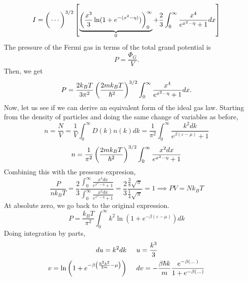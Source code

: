         \begin{equation}
            I = \bigg(\cdots\bigg)^{3/2}\left[ \underbrace{\left( \frac{x^3}{3}\ln(1+e^{-(x^2-\eta)}) \right)_0^\infty}_0+ \frac{2}{3}\int_{0}^{\infty}\frac{x^4}{e^{x^2-\eta}+1}dx \right]
        \end{equation}
        The pressure of the Fermi gas in terms of the total grand potential is
        \begin{equation}
            P = \frac{\Phi_G}{V}.
        \end{equation}
        Then, we get
        \begin{equation}
            P = \frac{2k_BT}{3\pi^2}\left( \frac{2mk_BT}{\hbar^2} \right)^{3/2}\int_{0}^{\infty}\frac{x^4}{e^{x^2-\eta}+1}dx.
        \end{equation}
        Now, let us see if we can derive an equivalent form of the ideal gas law. Starting from the density of particles and doing the same change of variables as before,
        \begin{equation}
            n = \frac{N}{V} = \frac{1}{V}\int_{0}^{\infty}D(k)n(k)dk = \frac{1}{\pi^2}\int_{0}^{\infty}\frac{k^2dk}{e^{\beta(\varepsilon-\mu)}+1}
        \end{equation}
        \begin{equation}
            n = \frac{1}{\pi^2}\left( \frac{2mk_BT}{\hbar^2} \right)^{3/2}\int_{0}^{\infty}\frac{x^2dx}{e^{x^2-\eta}+1}
        \end{equation}
        Combining this with the pressure expresion,
        \begin{equation}
            \frac{P}{nk_BT}=\frac{2}{3}\frac{\int_{0}^{\infty}\frac{x^4dx}{e^{x^2-\eta}+1}}{\int_{0}^{\infty}\frac{x^2dx}{e^{x^2-\eta}+1}}=\frac{2}{3}\frac{\frac{3}{8}\sqrt{\pi}}{\frac{1}{4}\sqrt{\pi}}=1 \implies PV = Nk_BT
        \end{equation}
        At absolute zero, we go back to the original expression.
        \begin{equation}
            P = \frac{k_BT}{\pi^2}\int_{0}^{\infty}k^2\ln(1+e^{-\beta(\varepsilon-\mu)})dk 
        \end{equation}
        Doing integration by parts,
        \begin{align}
            du = k^2 dk \hspace{0.5cm}& u = \frac{k^3}{3}\\
            v = \ln\left( 1+e^{-\beta\left( \frac{\hbar^2k^2}{2m}-\mu \right)} \right) \hspace*{0.5cm}& dv = -\frac{\beta\hbar k}{m}\frac{e^{-\beta(\dots)}}{1+e^{-\beta(...)}}
        \end{align}
